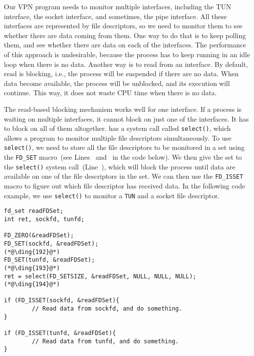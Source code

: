 Our VPN program needs to monitor multiple interfaces, including the TUN interface, the socket
interface, and sometimes, the pipe interface.   
All these interfaces are represented by file descriptors, so we need to 
monitor them to see whether there are data coming from them. 
One way to do that is to keep polling them, and
see whether there are data on each of the interfaces. The performance of this approach is
undesirable, because the process has to keep running in an idle loop when there is no data.
Another way is to read from an interface.  By default, read is blocking, i.e., the process will
be suspended if there are no data. When data become available, the process will be unblocked,
and its execution will continue. This way, it does not waste CPU time when there is no data.

The read-based blocking mechanism works well for one interface. If a process is waiting on
multiple interfaces, it cannot block on just one of the interfaces. It has to block on all of
them altogether.  \linux has a system call called \texttt{select()}, which
allows a program to monitor multiple file descriptors simultaneously.
To use \texttt{select()}, we need to store all the file descriptors to be monitored in a set
using the \texttt{FD\_SET} macro~(see Lines~ and~ in
the code below).  We then give the set to the \texttt{select()} system
call~(Line~), which will block the process until data are available on one of the
file descriptors in the set.  We can then use the \texttt{FD\_ISSET} macro to figure out which
file descriptor has received data. In the following code example, 
we use \texttt{select()} to monitor a \texttt{TUN} and a socket file
descriptor.


\begin{lstlisting}
fd_set readFDSet;
int ret, sockfd, tunfd;

FD_ZERO(&readFDSet);
FD_SET(sockfd, &readFDSet);                                (*@\ding{192}@*)
FD_SET(tunfd, &readFDSet);                                 (*@\ding{193}@*)
ret = select(FD_SETSIZE, &readFDSet, NULL, NULL, NULL);    (*@\ding{194}@*)

if (FD_ISSET(sockfd, &readFDSet){
        // Read data from sockfd, and do something.
}

if (FD_ISSET(tunfd, &readFDSet){
        // Read data from tunfd, and do something. 
}
\end{lstlisting}



